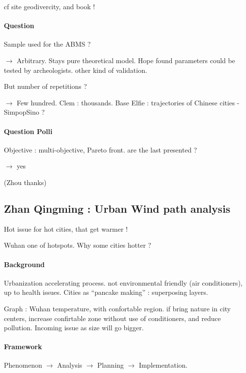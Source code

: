 cf site geodivercity, and book !

\paragraph{Question}

Sample used for the ABMS ?

$\rightarrow$ Arbitrary. Stays pure theoretical model. Hope found parameters could be tested by archeologists. other kind of validation.

But number of repetitions ?

$\rightarrow$ Few hundred. Clem : thousands. Base Elfie : trajectories of Chinese cities - SimpopSino ?

\paragraph{Question Polli}

Objective : multi-objective, Pareto front. are the last presented ?

$\rightarrow$ yes

(Zhou thanks)


\subsection*{Zhan Qingming : Urban Wind path analysis}


Hot issue for hot cities, that get warmer !

Wuhan one of hotspots. Why some cities hotter ?

\paragraph{Background}

Urbanization accelerating process. not environmental friendly (air conditioners), up to health issues. Cities as ``pancake making'' : superposing layers.

Graph : Wuhan temperature, with confortable region. if bring nature in city centers, increase confirtable zone without use of conditioners, and reduce pollution. Incoming issue as size will go bigger.

\paragraph{Framework}

Phenomenon $\rightarrow$ Analysis $\rightarrow$ Planning $\rightarrow$ Implementation.

